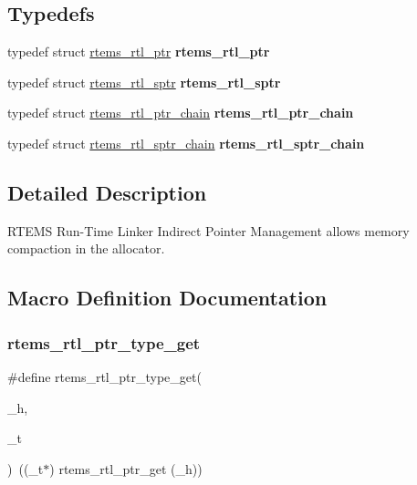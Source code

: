 \subsection*{Typedefs}
\begin{DoxyCompactItemize}
\item 
\mbox{\label{rtl-indirect-ptr_8h_a8d28c75fa511a9e1b23fcc69507da23d}} 
typedef struct \mbox{\hyperlink{structrtems__rtl__ptr}{rtems\+\_\+rtl\+\_\+ptr}} {\bfseries rtems\+\_\+rtl\+\_\+ptr}
\item 
\mbox{\label{rtl-indirect-ptr_8h_a6c7a3c25a74b16e26f80d4ede8b30f15}} 
typedef struct \mbox{\hyperlink{structrtems__rtl__sptr}{rtems\+\_\+rtl\+\_\+sptr}} {\bfseries rtems\+\_\+rtl\+\_\+sptr}
\item 
\mbox{\label{rtl-indirect-ptr_8h_acb835aebbc4756cb0447e160a3f3d708}} 
typedef struct \mbox{\hyperlink{structrtems__rtl__ptr__chain}{rtems\+\_\+rtl\+\_\+ptr\+\_\+chain}} {\bfseries rtems\+\_\+rtl\+\_\+ptr\+\_\+chain}
\item 
\mbox{\label{rtl-indirect-ptr_8h_ad089228a39f101504f1b1d99b04f0a34}} 
typedef struct \mbox{\hyperlink{structrtems__rtl__sptr__chain}{rtems\+\_\+rtl\+\_\+sptr\+\_\+chain}} {\bfseries rtems\+\_\+rtl\+\_\+sptr\+\_\+chain}
\end{DoxyCompactItemize}


\subsection{Detailed Description}
R\+T\+E\+MS Run-\/\+Time Linker Indirect Pointer Management allows memory compaction in the allocator. 



\subsection{Macro Definition Documentation}
\mbox{\label{rtl-indirect-ptr_8h_ad9a4901ea8002117e32d27dbfae17a97}} 
\subsubsection{\texorpdfstring{rtems\_rtl\_ptr\_type\_get}{rtems\_rtl\_ptr\_type\_get}}
{\footnotesize\ttfamily \#define rtems\+\_\+rtl\+\_\+ptr\+\_\+type\+\_\+get(\begin{DoxyParamCaption}\item[{}]{\+\_\+h,  }\item[{}]{\+\_\+t }\end{DoxyParamCaption})~((\+\_\+t$\ast$) rtems\+\_\+rtl\+\_\+ptr\+\_\+get (\+\_\+h))}


